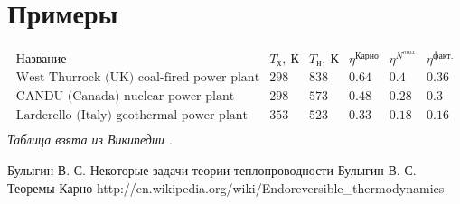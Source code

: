 \documentclass[a4paper]{article}
\begin{document}
\section{Примеры}
\label{exsection}
$$
\begin{array}{llllll}
\text{Название} & T_{\text{х}},\ \text{К} & T_{\text{н}},\ \text{К} & \eta^{\text{Карно}} & \eta^{N^{max}} & \eta^{\text{факт.}}\\
\text{West Thurrock (UK) coal-fired power plant} & 298 & 838 & 0.64 & 0.4 & 0.36\\
\text{CANDU (Canada) nuclear power plant} & 298 & 573 & 0.48 & 0.28 & 0.3\\
\text{Larderello (Italy) geothermal power plant} & 353 & 523 & 0.33 & 0.18 & 0.16\\
\end{array}
$$
\newline
{\em Таблица взята из Википедии \cite{w1}}.
\begin{thebibliography}{3}
 Булыгин В. С. Некоторые задачи теории теплопроводности
 Булыгин В. С. Теоремы Карно
 http://en.wikipedia.org/wiki/Endoreversible\_thermodynamics
\end{thebibliography}
\end{document}
